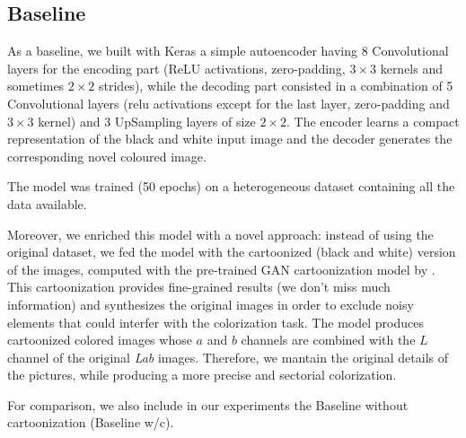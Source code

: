 \subsection{Baseline}
As a baseline, we built with Keras a simple autoencoder having 8 Convolutional layers for the encoding part (ReLU activations, zero-padding, $3\times3$ kernels and sometimes $2\times2$ strides), while the decoding part consisted in a combination of 5 Convolutional layers (relu activations except for the last layer, zero-padding and $3\times3$ kernel) and 3 UpSampling layers of size $2\times2$. The encoder learns a compact representation of the black and white input image and the decoder generates the corresponding novel coloured image.

The model was trained (50 epochs) on a heterogeneous dataset containing all the data available.

Moreover, we enriched this model with a novel approach: instead of using the original dataset, we fed the model with the cartoonized (black and white) version of the images, computed with the pre-trained GAN cartoonization model by \cite{cartoonize}. This cartoonization provides fine-grained results (we don't miss much information) and synthesizes the original images in order to exclude noisy elements that could interfer with the colorization task. The model produces cartoonized colored images whose $a$ and $b$ channels are combined with the $L$ channel of the original \textit{Lab} images. Therefore, we mantain the original details of the pictures, while producing a more precise and sectorial colorization.

For comparison, we also include in our experiments the Baseline without cartoonization (Baseline w/c).
